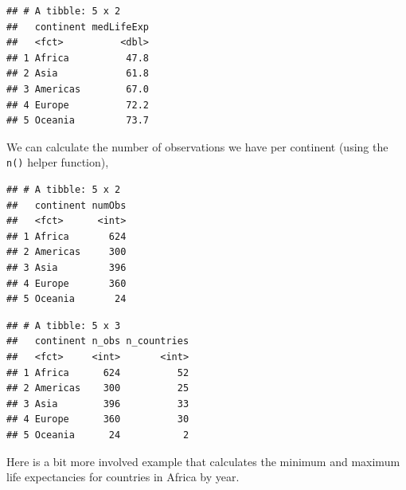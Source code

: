 \documentclass[]{article}
\newenvironment{Shaded}{\begin{snugshade}}{\end{snugshade}}
\newcommand{\KeywordTok}[1]{\textcolor[rgb]{0.13,0.29,0.53}{\textbf{#1}}}
\newcommand{\DataTypeTok}[1]{\textcolor[rgb]{0.13,0.29,0.53}{#1}}
\newcommand{\StringTok}[1]{\textcolor[rgb]{0.31,0.60,0.02}{#1}}
\newcommand{\OperatorTok}[1]{\textcolor[rgb]{0.81,0.36,0.00}{\textbf{#1}}}
\newcommand{\NormalTok}[1]{#1}
\begin{document}
\begin{verbatim}
## # A tibble: 5 x 2
##   continent medLifeExp
##   <fct>          <dbl>
## 1 Africa          47.8
## 2 Asia            61.8
## 3 Americas        67.0
## 4 Europe          72.2
## 5 Oceania         73.7
\end{verbatim}

We can calculate the number of observations we have per continent (using
the \texttt{n()} helper function),

\begin{Shaded}
\end{Shaded}

\begin{verbatim}
## # A tibble: 5 x 2
##   continent numObs
##   <fct>      <int>
## 1 Africa       624
## 2 Americas     300
## 3 Asia         396
## 4 Europe       360
## 5 Oceania       24
\end{verbatim}

\begin{Shaded}
\end{Shaded}

\begin{verbatim}
## # A tibble: 5 x 3
##   continent n_obs n_countries
##   <fct>     <int>       <int>
## 1 Africa      624          52
## 2 Americas    300          25
## 3 Asia        396          33
## 4 Europe      360          30
## 5 Oceania      24           2
\end{verbatim}

Here is a bit more involved example that calculates the minimum and
maximum life expectancies for countries in Africa by year.

\begin{Shaded}
\end{Shaded}
\end{document}
